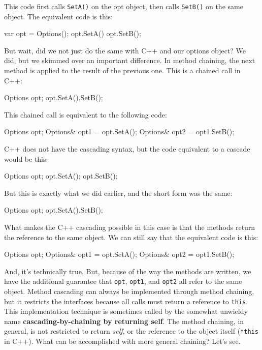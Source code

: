 This code first calls \texttt{SetA()} on the opt object, then calls \texttt{SetB()} on the same object. The equivalent code is this:

\begin{code}
var opt = Options();
opt.SetA()
opt.SetB();
\end{code}

But wait, did we not just do the same with C++ and our options object? We did, but we skimmed over an important difference. In method chaining, the next method is applied to the result of the previous one. This is a chained call in C++:

\begin{code}
Options opt;
opt.SetA().SetB();
\end{code}

This chained call is equivalent to the following code:

\begin{code}
Options opt;
Options& opt1 = opt.SetA();
Options& opt2 = opt1.SetB();
\end{code}

C++ does not have the cascading syntax, but the code equivalent to a cascade would be this:

\begin{code}
Options opt;
opt.SetA();
opt.SetB();
\end{code}

But this is exactly what we did earlier, and the short form was the same:

\begin{code}
Options opt;
opt.SetA().SetB();
\end{code}

What makes the C++ cascading possible in this case is that the methods return the reference to the same object. We can still say that the equivalent code is this:

\begin{code}
Options opt;
Options& opt1 = opt.SetA();
Options& opt2 = opt1.SetB();
\end{code}

And, it's technically true. But, because of the way the methods are written, we have the additional guarantee that \texttt{opt}, \texttt{opt1}, and \texttt{opt2} all refer to the same object. Method cascading can always be implemented through method chaining, but it restricts the interfaces because all calls must return a reference to \texttt{this}. This implementation technique is sometimes called by the somewhat unwieldy name \textbf{cascading-by-chaining by returning self}. The method chaining, in general, is not restricted to return \emph{self,} or the reference to the object itself (\texttt{*this} in C++). What can be accomplished with more general chaining? Let's see.

